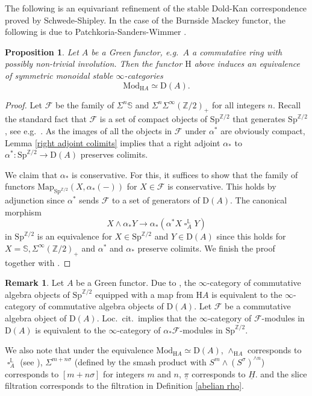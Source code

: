 \documentclass[10pt]{amsart}
\newtheorem{prop}[thm]{Proposition}
\theoremstyle{definition}
\newtheorem{rmk}[thm]{Remark}
\numberwithin{equation}{section}
\renewcommand{\L}{\mathbb{L}}
\newcommand{\Sphere}{\mathbb{S}}
\newcommand{\Z}{\mathbb{Z}}
\newcommand{\cF}{\mathcal{F}}
\newcommand{\rD}{\mathrm{D}}
\newcommand{\rH}{\mathrm{H}}
\newcommand{\ul}{\underline}
\newcommand{\Mod}{\mathrm{Mod}}
\newcommand{\Sp}{\mathrm{Sp}}
\newcommand{\Map}{\mathrm{Map}}
\DeclareMathOperator{\sotimes}{\square}
\begin{document}
The following is an equivariant refinement of the stable Dold-Kan correspondence \cite[Theorem 5.1.6]{SS03} proved by Schwede-Shipley.
In the case of the Burnside Mackey functor,
the following is due to Patchkoria-Sanders-Wimmer \cite[Theorem 5.10]{PSW22}.

\begin{prop}\label{greenequivalence}
Let $A$ be a Green functor, e.g.\ $A$ a commutative ring with possibly non-trivial involution.
Then the functor $\rH$
above induces an equivalence of symmetric monoidal stable  $\infty$-categories
\[
\Mod_{\rH A}
\simeq
\rD(A).
\]
\end{prop}
\begin{proof}
Let $\cF$ be the family of $\Sigma^n\Sphere$ and $\Sigma^n \Sigma^\infty (\Z/2)_+$ for all integers $n$.
Recall the standard fact that $\cF$ is a set of compact objects of $\Sp^{\Z/2}$ that generates $\Sp^{\Z/2}$,
see e.g.\ \cite[Proposition A.1.6]{HP23}.
As the images of all the objects in $\cF$ under $\alpha^*$ are obviously compact,
Lemma \ref{right adjoint colimits} implies that a right adjoint $\alpha_*$ to $\alpha^*
\colon
\Sp^{\Z/2}
\to
\rD(A)$
preserves colimits.

We claim that $\alpha_*$ is conservative.
For this,
it suffices to show that the family of functors $\Map_{\Sp^{\Z/2}}(X,\alpha_*(-))$ for $X\in \cF$ is conservative.
This holds by adjunction since $\alpha^*$ sends $\cF$ to a set of generators of $\rD(A)$.
The canonical morphism
\[
X\wedge \alpha_* Y\to \alpha_*(\alpha^*X\sotimes_{A}^\L Y)
\]
in $\Sp^{\Z/2}$ is an equivalence for $X\in \Sp^{\Z/2}$ and $Y\in \rD(A)$ since this holds for $X=\Sphere,\Sigma^\infty (\Z/2)_+$ and $\alpha^*$ and $\alpha_*$ preserve colimits.
We finish the proof together with \cite[Corollary 4.8.5.21]{HA}.
\end{proof}

\begin{rmk}
\label{Dold-Kan remark}
Let $A$ be a Green functor.
Due to \cite[section 3.4.1]{HA}, the $\infty$-category of commutative algebra objects of $\Sp^{\Z/2}$ equipped with a map from $\rH A$ is equivalent to the $\infty$-category of commutative algebra objects of $\rD(A)$.
Let $\cF$ be a commutative algebra object of $\rD(A)$.
Loc.\ cit.\ implies that the $\infty$-category of $\cF$-modules in $\rD(A)$ is equivalent to the $\infty$-category of $\alpha_*\cF$-modules in $\Sp^{\Z/2}$.

We also note that under the equivalence $\Mod_{\rH A}\simeq \rD(A)$,
$\wedge_{\rH A}$ corresponds to $\sotimes_A^\L$ (see \cite[Proposition A.5.7]{HP23}),
$\Sigma^{m+n\sigma}$ (defined by the smash product with $S^m \wedge (S^\sigma)^{\wedge n}$) corresponds to $[m+n\sigma]$ for integers $m$ and $n$,
$\ul{\pi}$ corresponds to $\ul{H}$.
and the slice filtration corresponds to the filtration in Definition \ref{abelian rho}.
\end{rmk}
\end{document}
